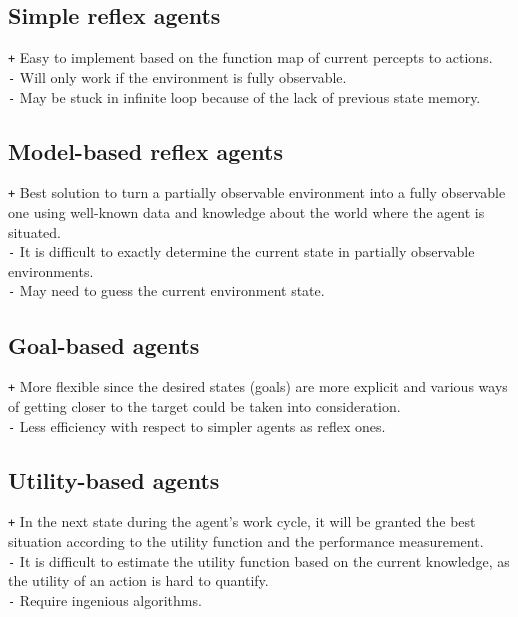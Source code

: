 \documentclass{article}
\begin{document}
\subsection{Simple reflex agents}
\texttt{+} Easy to implement based on the function map of current percepts to actions.\\
\texttt{-} Will only work if the environment is fully observable.\\
\texttt{-} May be stuck in infinite loop because of the lack of previous state memory.

\subsection{Model-based reflex agents}
\texttt{+} Best solution to turn a partially observable environment into a fully observable one using well-known data and knowledge about the world where the agent is situated.\\
\texttt{-} It is difficult to exactly determine the current state in partially observable environments.\\
\texttt{-} May need to guess the current environment state.

\subsection{Goal-based agents}
\texttt{+} More flexible since the desired states (goals) are more explicit and various ways of getting closer to the target could be taken into consideration.\\
\texttt{-} Less efficiency with respect to simpler agents as reflex ones.

\subsection{Utility-based agents}
\texttt{+} In the next state during the agent’s work cycle, it will be granted the best situation according to the utility function and the performance measurement.\\
\texttt{-} It is difficult to estimate the utility function based on the current knowledge, as the utility of an action is hard to quantify.\\
\texttt{-} Require ingenious algorithms.


\newpage
\end{document}
